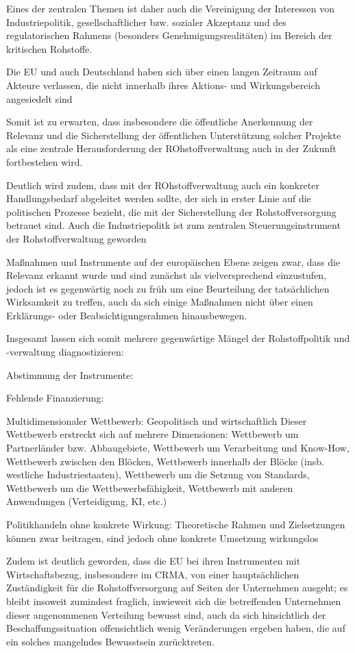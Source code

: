 \documentclass[12pt,a4paper,oneside]{book} %
\begin{document}
{Eines der zentralen Themen ist daher auch die Vereinigung der Interessen von Industriepolitik, gesellschaftlicher bzw. sozialer Akzeptanz und des regulatorischen Rahmens (besonders Genehmigungsrealitäten) im Bereich der kritischen Rohstoffe.

Die EU und auch Deutschland haben sich über einen langen Zeitraum auf Akteure verlassen, die nicht innerhalb ihres Aktions- und Wirkungsbereich angesiedelt sind


Somit ist zu erwarten, dass insbesondere die öffentliche Anerkennung der Relevanz und die Sicherstellung der öffentlichen Unterstützung solcher Projekte als eine zentrale Herausforderung der ROhstoffverwaltung auch in der Zukunft fortbestehen wird.

Deutlich wird zudem, dass mit der ROhstoffverwaltung auch ein konkreter Handlungsbedarf abgeleitet werden sollte, der sich in erster Linie auf die politischen Prozesse bezieht, die mit der Sicherstellung der Rohstoffversorgung betrauet sind. Auch die Industriepolitk ist zum zentralen Steuerungsinstrument der Rohstoffverwaltung geworden

Maßnahmen und Instrumente auf der europäischen Ebene zeigen zwar, dass die Relevanz erkannt wurde und sind zunächst als vielversprechend einzustufen, jedoch ist es gegenwärtig noch zu früh um eine Beurteilung der tatsächlichen Wirksamkeit zu treffen, auch da sich einige Maßnahmen nicht über einen Erklärungs- oder Beabsichtigungsrahmen hinausbewegen.

Insgesamt lassen sich somit mehrere gegenwärtige Mängel der Rohstoffpolitik und -verwaltung diagnostizieren:

Abstimmung der Instrumente: 

Fehlende Finanzierung:

Multidimensionaler Wettbewerb: Geopolitisch und wirtschaftlich
Dieser Wettbewerb erstreckt sich auf mehrere Dimensionen: Wettbewerb um Partnerländer bzw. Abbaugebiete, Wettbewerb um Verarbeitung und Know-How, Wettbewerb zwischen den Blöcken, Wettbewerb innerhalb der Blöcke (insb. westliche Industriestaaten), Wettbewerb um die Setzung von Standards, Wettbewerb um die Wettbewerbsfähigkeit, Wettbewerb mit anderen Anwendungen (Verteidigung, KI, etc.)

Politikhandeln ohne konkrete Wirkung: Theoretische Rahmen und Zielsetzungen können zwar beitragen, sind jedoch ohne konkrete Umsetzung wirkungslos

Zudem ist deutlich geworden, dass die EU bei ihren Instrumenten mit Wirtschaftsbezug, insbesondere im CRMA, von einer hauptsächlichen Zuständigkeit für die Rohstoffversorgung auf Seiten der Unternehmen ausgeht; es bleibt insoweit zumindest fraglich, inwieweit sich die betreffenden Unternehmen dieser angenommenen Verteilung bewusst sind, auch da sich hinsichtlich der Beschaffungssituation offensichtlich wenig Veränderungen ergeben haben, die auf ein solches mangelndes Bewusstsein zurücktreten.

}
\end{document}
